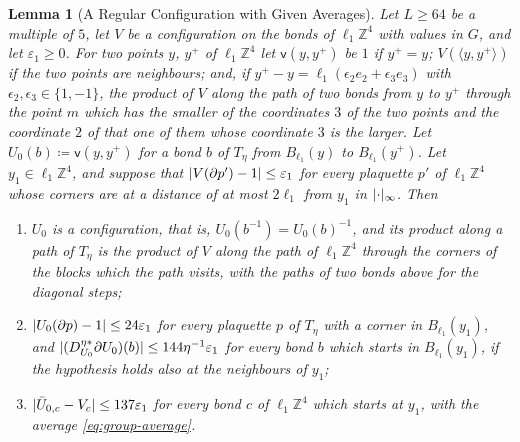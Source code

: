 \documentclass[11pt]{preprint}
\DeclarePairedDelimiter{\abs}{\lvert}{\rvert}
\numberwithin{equation}{section}
\newtheorem{lemma}[theorem]{Lemma}
\theoremstyle{definition}
\theoremstyle{remark}
\theoremstyle{plain}
\begin{document}
\begin{lemma}[A Regular Configuration with Given Averages]\label{lem:lift}
Let $L \geq 64$ be a multiple of $5$, let $V$ be a configuration on the bonds of $\ell_1\mathbb Z^4$ with values in $G$, and let $\varepsilon_1 \geq 0$. For two points $y$, $y^+$ of $\ell_1\mathbb Z^4$ let $\mathsf v(y, y^+)$ be $1$ if $y^+ = y$; $V(\langle y, y^+\rangle)$ if the two points are neighbours; and, if $y^+ - y = \ell_1(\epsilon_2e_2 + \epsilon_3e_3)$ with $\epsilon_2, \epsilon_3 \in \{ 1, -1 \}$, the product of $V$ along the path of two bonds from $y$ to $y^+$ through the point $m$ which has the smaller of the coordinates $3$ of the two points and the coordinate $2$ of that one of them whose coordinate $3$ is the larger. Let $U_0(b) \coloneqq \mathsf v(y, y^+)$ for a bond $b$ of $T_\eta$ from $B_{\ell_1}(y)$ to $B_{\ell_1}(y^+)$. Let $y_1 \in \ell_1\mathbb Z^4$, and suppose that $\abs{V(\partial p') - 1} \leq \varepsilon_1$ for every plaquette $p'$ of $\ell_1\mathbb Z^4$ whose corners are at a distance of at most $2\ell_1$ from $y_1$ in $\abs\cdot_\infty$. Then
\begin{enumerate}[label=(\roman*)]
\item $U_0$ is a configuration, that is, $U_0(b^{-1}) = U_0(b)^{-1}$, and its product along a path of $T_\eta$ is the product of $V$ along the path of $\ell_1\mathbb Z^4$ through the corners of the blocks which the path visits, with the paths of two bonds above for the diagonal steps;
\item $\abs{U_0(\partial p) - 1} \leq 24\varepsilon_1$ for every plaquette $p$ of $T_\eta$ with a corner in $B_{\ell_1}(y_1)$, and $\abs{(D^{\eta*}_{U_0}\partial U_0)(b)} \leq 144\eta^{-1}\varepsilon_1$ for every bond $b$ which starts in $B_{\ell_1}(y_1)$, if the hypothesis holds also at the neighbours of $y_1$;
\item $\abs{\bar U_{0,c} - V_c} \leq 137\varepsilon_1$ for every bond $c$ of $\ell_1\mathbb Z^4$ which starts at $y_1$, with the average \eqref{eq:group-average}.
\end{enumerate}
\end{lemma}
\end{document}
